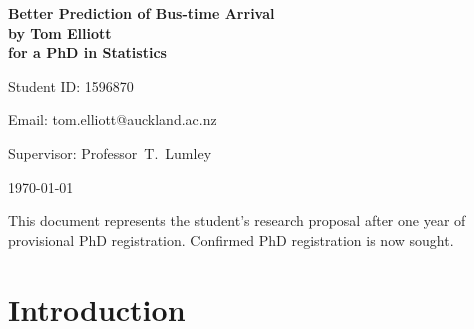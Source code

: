 \documentclass[12pt,a4paper]{article}
\begin{document}
\begin{Large}
\begin{center}
\textbf{Better Prediction of Bus-time Arrival} \\
\textbf{by Tom Elliott} \\
\textbf{for a PhD in Statistics}
\end{center}
\end{Large}


\hfill{Student ID: 1596870}

\hfill{Email: tom.elliott@auckland.ac.nz}

Supervisor: Professor~T.~Lumley





\begin{center}
\today
\end{center}


This document represents the student's research proposal after
one year of provisional PhD registration.
Confirmed PhD registration is now sought.




\section{Introduction}
\label{sec:intro}








\end{document}
